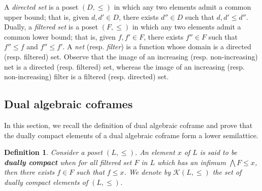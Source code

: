 \documentclass{article}
\newcommand{\blue}{\color{blue}}
\newtheorem{definition}[theorem]{Definition}
\begin{document}

A \textit{directed set} is a poset $(D,\le)$ in which any two elements admit a common upper bound; that is, given $d,d' \in D$, there exists $d'' \in D$ such that $d,d' \le d''$. Dually, a \textit{filtered set} is a poset $(F,\le)$ in which any two elements admit a common lower bound; that is, given $f,f' \in F$, there exists $f'' \in F$ such that $f'' \le f$ and $f'' \le f'$. A \textit{net} (resp. \textit{filter}) is a function whose domain is a directed (resp. filtered) set. Observe that the image of an increasing (resp. non-increasing) net is a directed (resp. filtered) set, whereas the image of an increasing (resp. non-increasing) filter is a filtered (resp. directed) set.


\subsection{Dual algebraic coframes\label{section.def.densely.dominated}}

In this section, we recall the definition of dual algebraic coframe and prove that the dually compact elements of a dual algebraic coframe form a lower semilattice.


\begin{definition}
    Consider a poset $(L,\le)$. An element $x$ of $L$ is said to be \textbf{dually compact} when for all filtered set $F$ in $L$ which has an infimum $\bigwedge F \le x$, then there exists $f \in F$ such that $f \le x$. We denote by $\mathcal{K}(L,\le)$ the set of dually compact elements of $(L,\le)$.
\end{definition}
\end{document}
